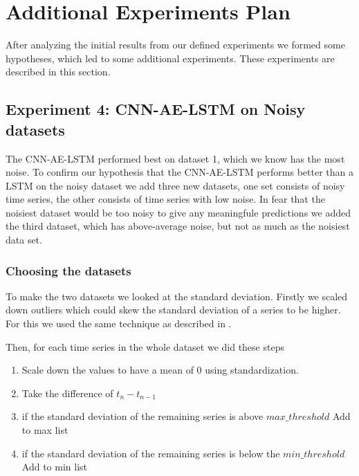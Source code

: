 \section{Additional Experiments Plan}
\label{section:Results:AdditionalExperimentalPlan}
After analyzing the initial results from our defined experiments
we formed some hypotheses, which led to some additional experiments.
These experiments are described in this section.

\subsection{Experiment 4: CNN-AE-LSTM on Noisy datasets}
\label{section:results:additional-experimental-plan:Experiment-4}
The CNN-AE-LSTM performed best on dataset 1, which we know
has the most noise. To confirm our hypothesis
that the CNN-AE-LSTM performs better than a LSTM
on the noisy dataset we add three new datasets,
one set consists of noisy time series,
the other consists of time series with low noise.
In fear that the noisiest dataset would be too noisy to give any meaningfule
predictions we added the third dataset, which has above-average noise, but not
as much as the noisiest data set.


\subsubsection{Choosing the datasets}
To make the two datasets we looked at the standard deviation.
Firstly we scaled down outliers which could skew the standard deviation of
a series to be higher. For this we used the same technique
as described in .

Then, for each time series in the whole dataset we did these steps
\begin{enumerate}
  \item Scale down the values to have a mean of 0 using standardization.
  \item Take the difference of $t_n - t_{n-1}$
  \item if the standard deviation of the remaining series is above $max\_threshold$ \-\> Add to max list
  \item if the standard deviation of the remaining series is below the $min\_threshold$ \-\> Add to min list
\end{enumerate}

